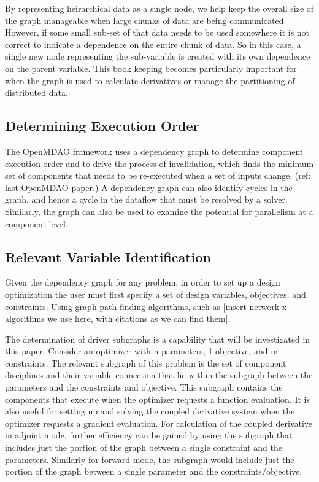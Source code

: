 \documentclass[]{aiaa-tc} %
\begin{document}
    By representing heirarchical data as a single node, we help keep the overall size of the graph manageable 
    when large chunks of data are being communicated. However, if some small sub-set of that data needs to be 
    used somewhere it is not correct to indicate a dependence on the entire chunk of data. So in this case, a 
    single new node representing the sub-variable is created with its own dependence on the parent variable. 
    This book keeping becomes particularly important for when the graph is used to calculate derivatives or 
    manage the partitioning of distributed data. 

    \subsection{Determining Execution Order}
    The OpenMDAO framework uses a dependency graph to determine component execution order and to
    drive the process of invalidation, which finds the minimum set of components that needs to
    be re-executed when a set of inputs change. (ref: last OpenMDAO paper.) A dependency graph
    can also identify cycles in the graph, and hence a cycle in the dataflow that must be resolved
    by a solver. Similarly, the graph can also be used to examine the potential for parallelism at
    a component level.

    \subsection{Relevant Variable Identification}
    Given the dependency graph for any problem, in order to set up a design optimization the user
    must first specify a set of design variables, objectives, and constraints. Using graph 
    path finding algorithms, such as [insert network x algorithms we use here, with citations as we can find them]. 

    The determination of driver subgraphs is a capability that will be investigated in this paper.
    Consider an optimizer with n parameters, 1 objective, and m constraints. The relevant 
    subgraph of this problem is the set of component disciplines and their variable connection that
    lie within the subgraph between the parameters and the constraints and objective. This subgraph
    contains the components that execute when the optimizer requests a function evaluation. It is
    also useful for setting up and solving the coupled derivative system when the optimizer requests
    a gradient evaluation. For calculation of the coupled derivative in adjoint mode, further
    efficiency can be gained by using the subgraph that includes just the portion of the graph 
    between a single constraint and the parameters. Similarly for forward mode, the subgraph would
    include just the portion of the graph between a single parameter and the constraints/objective.
\end{document}
